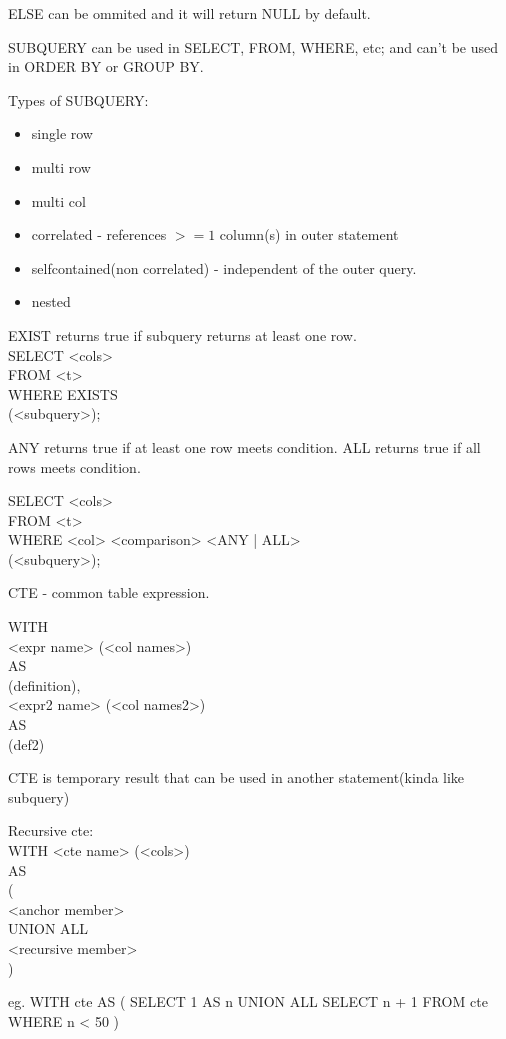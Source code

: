 \documentclass{article}
\begin{document}
    ELSE can be ommited and it will return NULL by default.

    SUBQUERY can be used in SELECT, FROM, WHERE, etc;
    and can't be used in ORDER BY or GROUP BY.

    Types of SUBQUERY:
    \begin{itemize}
        \item single row
        \item multi row
        \item multi col
        \item correlated - references $ >=1$  column(s) in outer statement
        \item selfcontained(non correlated) - independent of the outer query.
        \item nested
    \end{itemize}

    EXIST returns true if subquery returns at least one row. \\
    SELECT <cols> \\
    FROM <t> \\
    WHERE EXISTS \\
    (<subquery>);

    ANY returns true if at least one row meets condition.
    ALL returns true if all rows meets condition.
    
    SELECT <cols> \\
    FROM <t> \\
    WHERE <col> <comparison> <ANY | ALL> \\
    (<subquery>);

    CTE - common table expression.

    WITH \\
        <expr name> (<col names>) \\
        AS \\
            (definition), \\
        <expr2 name> (<col names2>) \\
        AS \\
            (def2)

    CTE is temporary result that can be used in another statement(kinda like subquery)

    Recursive cte: \\
    WITH <cte name> (<cols>) \\
    AS \\
    ( \\
        <anchor member> \\
        UNION  ALL \\
        <recursive member> \\
    )

    eg.
    WITH cte
    AS (
        SELECT 1 AS n
        UNION ALL
        SELECT n + 1
        FROM cte
        WHERE n < 50
    )
\end{document}
